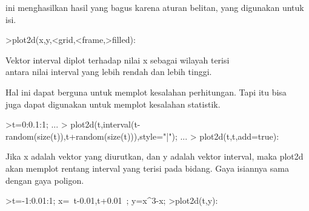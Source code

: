 \documentclass[a4paper,10pt]{article}
\begin{document}
\begin{eulernotebook}
\begin{eulercomment}
\begin{eulercomment}
\begin{eulercomment}
\begin{eulercomment}
\begin{eulercomment}
\begin{eulercomment}
\begin{eulercomment}
\begin{eulercomment}
\begin{eulercomment}
\begin{eulercomment}
\begin{eulercomment}
\begin{eulercomment}
\begin{eulercomment}
\begin{eulercomment}
\begin{eulercomment}
\begin{eulercomment}
\begin{eulercomment}
\begin{eulercomment}
\begin{eulercomment}
\begin{eulercomment}
\begin{eulercomment}
\begin{eulercomment}
\begin{eulercomment}
\begin{eulercomment}
\begin{eulercomment}
\begin{eulercomment}
\begin{eulercomment}
\begin{eulercomment}
\begin{eulercomment}
\begin{eulercomment}
\begin{eulercomment}
\begin{eulercomment}
\begin{eulercomment}
\begin{eulercomment}
\begin{eulercomment}
\begin{eulercomment}
\begin{eulercomment}
ini menghasilkan hasil yang bagus karena aturan belitan, yang
digunakan untuk\\
isi.
\end{eulercomment}
\begin{eulerprompt}
>plot2d(x,y,<grid,<frame,>filled):
\end{eulerprompt}
\begin{eulercomment}
Vektor interval diplot terhadap nilai x sebagai wilayah terisi\\
antara nilai interval yang lebih rendah dan lebih tinggi.

Hal ini dapat berguna untuk memplot kesalahan perhitungan. Tapi itu
bisa\\
juga dapat digunakan untuk memplot kesalahan statistik.
\end{eulercomment}
\begin{eulerprompt}
>t=0:0.1:1; ...
> plot2d(t,interval(t-random(size(t)),t+random(size(t))),style="|");  ...
> plot2d(t,t,add=true):
\end{eulerprompt}
\begin{eulercomment}
Jika x adalah vektor yang diurutkan, dan y adalah vektor interval,
maka plot2d akan memplot rentang interval yang terisi pada bidang.
Gaya isiannya sama dengan gaya poligon.
\end{eulercomment}
\begin{eulerprompt}
>t=-1:0.01:1; x=~t-0.01,t+0.01~; y=x^3-x;
>plot2d(t,y):
\end{eulerprompt}

\end{eulercomment}
\end{eulercomment}
\end{eulercomment}
\end{eulercomment}
\end{eulercomment}
\end{eulercomment}
\end{eulercomment}
\end{eulercomment}
\end{eulercomment}
\end{eulercomment}
\end{eulercomment}
\end{eulercomment}
\end{eulercomment}
\end{eulercomment}
\end{eulercomment}
\end{eulercomment}
\end{eulercomment}
\end{eulercomment}
\end{eulercomment}
\end{eulercomment}
\end{eulercomment}
\end{eulercomment}
\end{eulercomment}
\end{eulercomment}
\end{eulercomment}
\end{eulercomment}
\end{eulercomment}
\end{eulercomment}
\end{eulercomment}
\end{eulercomment}
\end{eulercomment}
\end{eulercomment}
\end{eulercomment}
\end{eulercomment}
\end{eulercomment}
\end{eulercomment}
\end{eulernotebook}
\end{document}
